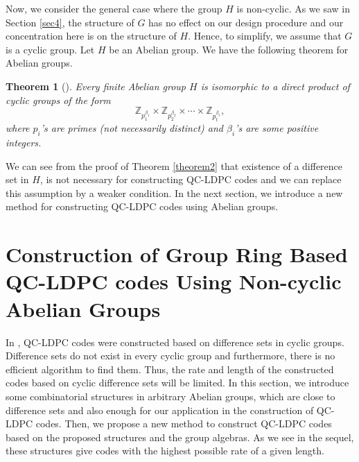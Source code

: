 \documentclass[journal,draftclsnofoot,onecolumn,12pt,twoside]{IEEEtran}
\newtheorem{theorem}{Theorem}
\begin{document}
Now, we consider the  general case where the group $H$ is non-cyclic. As we saw in Section \ref{sec4}, the structure of $G$ has no effect on our design procedure and our concentration here is on the structure of $H$. Hence, to simplify, we assume that $G$ is a cyclic group. Let $H$ be an Abelian group. We have the following theorem for Abelian groups.
\begin{theorem}[\emph{\cite[p.~193]{21}}]\label{theorem6}
Every finite Abelian group $H$ is isomorphic to a direct product of cyclic groups of the form
$$\mathbb{Z}_{p_1^{\beta_1}}\times \mathbb{Z}_{p_2^{\beta_2}}\times \cdots \times \mathbb{Z}_{p_t^{\beta_t}} ,$$
where $p_i$'s are primes (not necessarily distinct) and  $\beta_i$'s are some positive integers.
\end{theorem}


We can see from the proof of Theorem \ref{theorem2} that  existence of a difference set in $H$, is not necessary for constructing QC-LDPC codes and we can replace this assumption by a weaker condition. In the next section, we introduce a new method for constructing QC-LDPC codes using Abelian groups.
\section{Construction of Group Ring Based QC-LDPC codes Using Non-cyclic Abelian Groups}\label{Abelian groups}
In \cite{15}, QC-LDPC codes were constructed based on difference sets in cyclic groups. Difference sets do not exist in every cyclic group and furthermore, there is no efficient  algorithm to find them. Thus, the rate and length of the constructed codes based on cyclic difference sets will be limited. In this section, we introduce some combinatorial structures in arbitrary Abelian groups, which are close to difference sets and also enough for our application in the construction of QC-LDPC codes. Then, we propose a new method to construct QC-LDPC codes based on the  proposed structures and the group algebras. As we see in the sequel, these structures give  codes with the highest possible rate of a given length.
\end{document}
